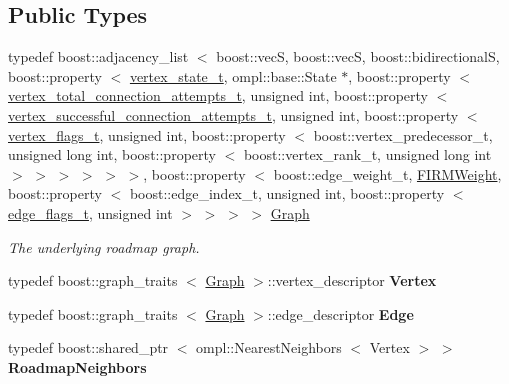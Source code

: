 \subsection*{\-Public \-Types}
\begin{DoxyCompactItemize}
\item 
typedef boost\-::adjacency\-\_\-list\*
$<$ boost\-::vec\-S, boost\-::vec\-S, \*
boost\-::bidirectional\-S, \*
boost\-::property\*
$<$ \hyperlink{struct_f_i_r_m_1_1vertex__state__t}{vertex\-\_\-state\-\_\-t}, \*
ompl\-::base\-::\-State \*
$\ast$, boost\-::property\*
$<$ \hyperlink{struct_f_i_r_m_1_1vertex__total__connection__attempts__t}{vertex\-\_\-total\-\_\-connection\-\_\-attempts\-\_\-t}, \*
unsigned int, boost\-::property\*
$<$ \hyperlink{struct_f_i_r_m_1_1vertex__successful__connection__attempts__t}{vertex\-\_\-successful\-\_\-connection\-\_\-attempts\-\_\-t}, \*
unsigned int, boost\-::property\*
$<$ \hyperlink{struct_f_i_r_m_1_1vertex__flags__t}{vertex\-\_\-flags\-\_\-t}, unsigned int, \*
boost\-::property\*
$<$ boost\-::vertex\-\_\-predecessor\-\_\-t, \*
unsigned long int, \*
boost\-::property\*
$<$ boost\-::vertex\-\_\-rank\-\_\-t, \*
unsigned long int $>$\*
 $>$ $>$ $>$ $>$ $>$, boost\-::property\*
$<$ boost\-::edge\-\_\-weight\-\_\-t, \*
\hyperlink{class_f_i_r_m_weight}{\-F\-I\-R\-M\-Weight}, boost\-::property\*
$<$ boost\-::edge\-\_\-index\-\_\-t, \*
unsigned int, boost\-::property\*
$<$ \hyperlink{struct_f_i_r_m_1_1edge__flags__t}{edge\-\_\-flags\-\_\-t}, unsigned int $>$ $>$ $>$ $>$ \hyperlink{class_f_i_r_m_a687e9f4243b22c30ee1fa5da22a85053}{\-Graph}
\begin{DoxyCompactList}\small\item\em \-The underlying roadmap graph. \end{DoxyCompactList}\item 
\hypertarget{class_f_i_r_m_a07eb05796ed64797c900b193aafa9031}{typedef boost\-::graph\-\_\-traits\*
$<$ \hyperlink{class_f_i_r_m_a687e9f4243b22c30ee1fa5da22a85053}{\-Graph} $>$\-::vertex\-\_\-descriptor {\bfseries \-Vertex}}\label{class_f_i_r_m_a07eb05796ed64797c900b193aafa9031}

\item 
\hypertarget{class_f_i_r_m_a88889998bf429572821d467eb44c67c6}{typedef boost\-::graph\-\_\-traits\*
$<$ \hyperlink{class_f_i_r_m_a687e9f4243b22c30ee1fa5da22a85053}{\-Graph} $>$\-::edge\-\_\-descriptor {\bfseries \-Edge}}\label{class_f_i_r_m_a88889998bf429572821d467eb44c67c6}

\item 
\hypertarget{class_f_i_r_m_a687705deb489cff3a2d40b7bec6bdc29}{typedef boost\-::shared\-\_\-ptr\*
$<$ ompl\-::\-Nearest\-Neighbors\*
$<$ \-Vertex $>$ $>$ {\bfseries \-Roadmap\-Neighbors}}\label{class_f_i_r_m_a687705deb489cff3a2d40b7bec6bdc29}


\end{DoxyCompactItemize}
